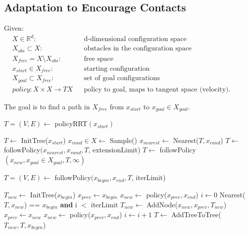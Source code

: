 \documentclass[../thesis.tex]{subfiles}
\begin{document}
\subsection{Adaptation to Encourage Contacts}
Given:
\begin{align*}
    &X \in \mathbb{R}^d:     &&\text{d-dimensional configuration space}\\
    &X_{obs} \subset X:      &&\text{obstacles in the configuration space}\\
    &X_{free} = X \setminus X_{obs}:   &&\text{free space}\\
    &x_{start} \in X_{free}:  &&\text{starting configuration}\\
    &X_{goal} \subset X_{free}: &&\text{set of goal configurations}\\
    &policy: X \times X \rightarrow TX &&\text{policy to goal, maps to tangent space (velocity).  Previous formulation was wrong, as need to be able to follow the policy to an arbitrary point in X, not just a goal configuration}
\end{align*}

The goal is to find a path in $X_{free}$ from $x_{start}$ to $x_{goal} \in X_{goal}$.


\begin{algorithm}
\caption{$T=(V,E) \leftarrow$ policyRRT$(x_{start})$}\label{euclid}
\begin{algorithmic}[1]
\State $T \leftarrow$ InitTree($x_{start}$)
\State $x_{rand} \in X \leftarrow$ Sample()
\State $x_{nearest} \leftarrow $ Nearest($T, x_{rand}$)
\State $T \leftarrow $ followPolicy$(x_{nearest}, x_{rand}, T$, extensionLimit)
\State $T \leftarrow $ followPolicy$(x_{new}, x_{goal} \in X_{goal}, T, \infty)$
\EndIf
\EndWhile
\end{algorithmic}
\end{algorithm}

\begin{algorithm}
\caption{$T=(V,E) \leftarrow$ followPolicy$(x_{begin}, x_{end}, T$, iterLimit)}\label{euclid}
\begin{algorithmic}[1]
\State $T_{new} \leftarrow $ InitTree($x_{begin}$)
\State $x_{prev} \leftarrow x_{begin}$
\State $x_{new} \leftarrow $ policy($x_{prev}, x_{end}$)
\State $i \leftarrow 0$
\StatexIndent[2] Nearest($T, x_{new}$) == $x_{begin}$ \textbf{and}
\StatexIndent[2] i $<$ iterLimit
\algorithmicdo
\State $T_{new} \leftarrow $ AddNode($x_{new}, x_{prev}, T_{new}$)
\State $x_{prev} \leftarrow x_{new}$ 
\State $x_{new} \leftarrow $ policy($x_{prev}, x_{end}$)
\State $i \leftarrow i+1$
\EndWhile
\State $T \leftarrow $ AddTreeToTree($T_{new}, T, x_{begin}$)
\end{algorithmic}
\end{algorithm}
\end{document}
